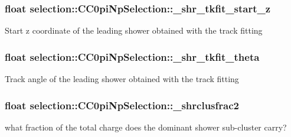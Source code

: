 \subsubsection[{\texorpdfstring{\+\_\+shr\+\_\+tkfit\+\_\+start\+\_\+z}{_shr_tkfit_start_z}}]{\setlength{\rightskip}{0pt plus 5cm}float selection\+::\+C\+C0pi\+Np\+Selection\+::\+\_\+shr\+\_\+tkfit\+\_\+start\+\_\+z\hspace{0.3cm}{\ttfamily [private]}}\hypertarget{classselection_1_1CC0piNpSelection_a4d3591a8bb7abd9e320f35ca3bf311c2}{}\label{classselection_1_1CC0piNpSelection_a4d3591a8bb7abd9e320f35ca3bf311c2}
Start z coordinate of the leading shower obtained with the track fitting 
\subsubsection[{\texorpdfstring{\+\_\+shr\+\_\+tkfit\+\_\+theta}{_shr_tkfit_theta}}]{\setlength{\rightskip}{0pt plus 5cm}float selection\+::\+C\+C0pi\+Np\+Selection\+::\+\_\+shr\+\_\+tkfit\+\_\+theta\hspace{0.3cm}{\ttfamily [private]}}\hypertarget{classselection_1_1CC0piNpSelection_a11df391e482434665c389423bbb9ec5d}{}\label{classselection_1_1CC0piNpSelection_a11df391e482434665c389423bbb9ec5d}
Track angle of the leading shower obtained with the track fitting 
\subsubsection[{\texorpdfstring{\+\_\+shrclusfrac2}{_shrclusfrac2}}]{\setlength{\rightskip}{0pt plus 5cm}float selection\+::\+C\+C0pi\+Np\+Selection\+::\+\_\+shrclusfrac2\hspace{0.3cm}{\ttfamily [private]}}\hypertarget{classselection_1_1CC0piNpSelection_acf870c688a80fa995ed5c6245fa02608}{}\label{classselection_1_1CC0piNpSelection_acf870c688a80fa995ed5c6245fa02608}
what fraction of the total charge does the dominant shower sub-\/cluster carry? 
